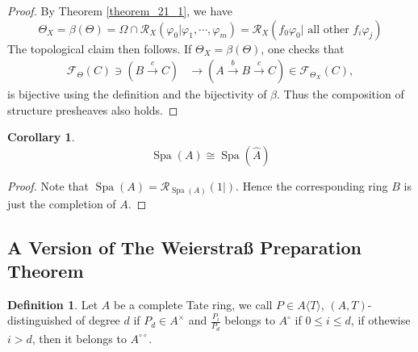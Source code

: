 \documentclass[10pt]{article}
\numberwithin{equation}{section}
\theoremstyle{definition}
\newtheorem{definition}{Definition}[subsection]
\newtheorem{corollary}{Corollary} [subsection]
\DeclareMathOperator{\Spa}{Spa}
\newcommand{\cR}[0]{\mathcal{R}}
\newcommand{\dcirc}[0]{{\circ\circ}}
\begin{document}
\begin{proof}
By Theorem \ref{theorem_21_1}, we have
\begin{equation*}
    \Theta_X = \beta(\Theta) = \Omega\cap\cR_X(\varphi_0|\varphi_1,\cdots,\varphi_m) = \cR_X(f_0\varphi_0|\text{ all other }f_i\varphi_j)
\end{equation*}
The topological claim then follows. If $\Theta_X = \beta(\Theta)$, one checks that
\begin{align*}
    \mathcal{F}_\Theta(C)\ni(B\stackrel{c}{\to}C)&\rightarrow (A\stackrel{b}{\to}B\stackrel{c}{\to}C)\in\mathcal{F}_{\Theta_X}(C),
\end{align*}
is bijective using the definition and the bijectivity of $\beta$. Thus the composition of structure presheaves also holds.
\end{proof}
\begin{corollary}
    \label{corollary_22_1}
    \begin{equation*}
        \Spa(A)\cong \Spa(\widehat{A})
    \end{equation*}
\end{corollary}
\begin{proof}
    Note that $\Spa(A) = \cR_{\Spa(A)}(1|)$. Hence the corresponding ring $B$ is just the completion of $A$.
\end{proof}

\subsection{A Version of The Weierstraß Preparation Theorem}

\begin{definition}
    \label{definition_26_1}
    Let $A$ be a complete Tate ring, we call $P\in A\langle T\rangle$, $(A,T)$-distinguished of degree $d$ if $P_d\in A^\times$ and ${\frac {P_i} {P_d}}$ belongs to $A^\circ$ if $0\leq i\leq d$, if othewise $i>d$, then it belongs to $A^{\dcirc}$.
\end{definition}
\end{document}
